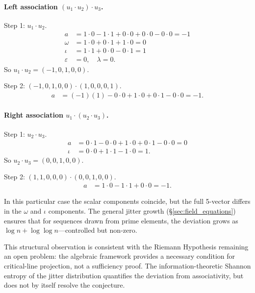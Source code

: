 \documentclass[12pt,oneside]{article}
\theoremstyle{principia}
\theoremstyle{definition}
\theoremstyle{remark}
\begin{document}
\paragraph{Left association $(u_1 \cdot u_2) \cdot u_3$.}

Step 1: $u_1 \cdot u_2$.
\begin{align}
a &= 1 \cdot 0 - 1 \cdot 1 + 0 \cdot 0 + 0 \cdot 0 - 0 \cdot 0 = -1 \\
\omega &= 1 \cdot 0 + 0 \cdot 1 + 1 \cdot 0 = 0 \\
\iota &= 1 \cdot 1 + 0 \cdot 0 - 0 \cdot 1 = 1 \\
\varepsilon &= 0, \quad \lambda = 0.
\end{align}
So $u_1 \cdot u_2 = (-1, 0, 1, 0, 0)$.

Step 2: $(-1, 0, 1, 0, 0) \cdot (1, 0, 0, 0, 1)$.
\begin{align}
a &= (-1)(1) - 0 \cdot 0 + 1 \cdot 0 + 0 \cdot 1 - 0 \cdot 0 = -1.
\end{align}

\paragraph{Right association $u_1 \cdot (u_2 \cdot u_3)$.}

Step 1: $u_2 \cdot u_3$.
\begin{align}
a &= 0 \cdot 1 - 0 \cdot 0 + 1 \cdot 0 + 0 \cdot 1 - 0 \cdot 0 = 0 \\
\iota &= 0 \cdot 0 + 1 \cdot 1 - 1 \cdot 0 = 1.
\end{align}
So $u_2 \cdot u_3 = (0, 0, 1, 0, 0)$.

Step 2: $(1, 1, 0, 0, 0) \cdot (0, 0, 1, 0, 0)$.
\begin{align}
a &= 1 \cdot 0 - 1 \cdot 1 + 0 \cdot 0 = -1.
\end{align}

In this particular case the scalar components coincide, but the
full 5-vector differs in the $\omega$ and $\iota$ components.
The general jitter growth (\S\ref{sec:field_equations}) ensures
that for sequences drawn from prime elements, the deviation
grows as $\log n + \log\log n$---controlled but non-zero.

This structural observation is consistent with the Riemann Hypothesis remaining an open problem: the algebraic framework provides a necessary condition for critical-line projection, not a sufficiency proof. The information-theoretic Shannon entropy of the jitter distribution quantifies the deviation from associativity, but does not by itself resolve the conjecture.
\end{document}
